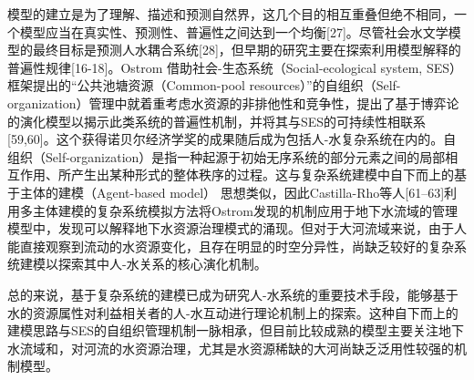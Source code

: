 模型的建立是为了理解、描述和预测自然界，这几个目的相互重叠但绝不相同，一个模型应当在真实性、预测性、普遍性之间达到一个均衡[27]。尽管社会水文学模型的最终目标是预测人水耦合系统[28]，但早期的研究主要在探索利用模型解释的普遍性规律[16-18]。Ostrom 借助社会-生态系统（Social-ecological system, SES）框架提出的“公共池塘资源（Common-pool resources）”的自组织（Self-organization）管理中就着重考虑水资源的非排他性和竞争性，提出了基于博弈论的演化模型以揭示此类系统的普遍性机制，并将其与SES的可持续性相联系[59,60]。这个获得诺贝尔经济学奖的成果随后成为包括人-水复杂系统在内的。自组织（Self-organization）是指一种起源于初始无序系统的部分元素之间的局部相互作用、所产生出某种形式的整体秩序的过程。这与复杂系统建模中自下而上的基于主体的建模（Agent-based model） 思想类似，因此Castilla-Rho等人[61–63]利用多主体建模的复杂系统模拟方法将Ostrom发现的机制应用于地下水流域的管理模型中，发现可以解释地下水资源治理模式的涌现。但对于大河流域来说，由于人能直接观察到流动的水资源变化，且存在明显的时空分异性，尚缺乏较好的复杂系统建模以探索其中人-水关系的核心演化机制。

总的来说，基于复杂系统的建模已成为研究人-水系统的重要技术手段，能够基于水的资源属性对利益相关者的人-水互动进行理论机制上的探索。这种自下而上的建模思路与SES的自组织管理机制一脉相承，但目前比较成熟的模型主要关注地下水流域和，对河流的水资源治理，尤其是水资源稀缺的大河尚缺乏泛用性较强的机制模型。
